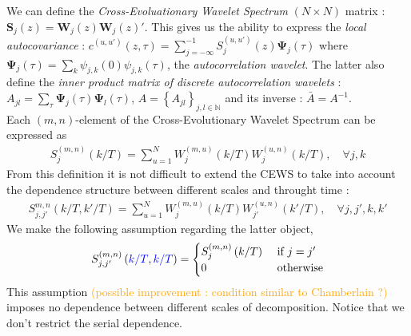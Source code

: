 \documentclass{article}
\numberwithin{equation}{section}
\let \oldsum \sum
\renewcommand{\sum}{\displaystyle \oldsum}
\newcommand{\eW}[4]{W_{#3}^{(#1,#2)}\left(#4/T\right)}
\newcommand{\eCEWS}[4]{S_{#3}^{(#1,#2)}\left(#4/T\right)}
\newcommand{\wavelet}[3]{\psi_{#1,#2}(#3)}
\newcommand{\ACwavelet}[2]{\bm{\Psi}_{#1}(#2)}
\begin{document}
We can define the \emph{Cross-Evoluationary Wavelet Spectrum} $(N \times N)$ matrix : $\bm{S}_{j}(z) = \bm{W}_{j}(z)\bm{W}_{j}(z)'$.
This gives us the ability to express the \emph{local autocovariance} : $c^{(u,u')}(z,\tau) = \sum_{j=-\infty}^{-1} S_{j}^{(u,u')}(z) \ACwavelet{j}{\tau}$ where $\ACwavelet{j}{\tau} = \sum_{k} \wavelet{j}{k}{0}\wavelet{j}{k}{\tau}$, the \emph{autocorrelation wavelet}. The latter also define the \emph{inner product matrix of discrete autocorrelation wavelets} : $A_{jl} = \sum_{\tau}\ACwavelet{j}{\tau}\ACwavelet{l}{\tau}$, $A = \left\{ A_{jl}\right\}_{j,l \in \mathbb{N}}$ and its inverse : $\bar{A} = A^{-1}$.\\

Each $(m,n)$-element of the Cross-Evolutionary Wavelet Spectrum can be expressed as 
\begin{align*}
	\eCEWS{m}{n}{j}{k} = \sum_{u=1}^{N} \eW{m}{u}{j}{k}\eW{u}{n}{j}{k}, \quad \forall j,k
\end{align*}
From this definition it is not difficult to extend the CEWS to take into account the dependence structure between different scales and throught time : 
\begin{align}\label{eq:serial-scale-CEWS}
	S_{j,j'}^{m,n}\left( k/T, k'/T \right) = \sum_{u=1}^{N} \eW{m}{u}{j}{k}\eW{u}{n}{j'}{k'}, \quad \forall j,j',k,k'
\end{align}
We make the following assumption regarding the latter object, 
\begin{align}\label{eq:scale-indep-spectrum}
S_{j,j'}^{(m,n)}\left( \textcolor{blue}{k/T}, \textcolor{blue}{k/T} \right) = 
	\begin{cases}
		\eCEWS{m}{n}{j}{k} & \text{ if } j=j' \\
		0 & \text{ otherwise}
	\end{cases}
\end{align}
This assumption \textcolor{orange}{(possible improvement : condition similar to Chamberlain ?)}  imposes no dependence between different scales of decomposition. Notice that we don't restrict the serial dependence. 
\end{document}
